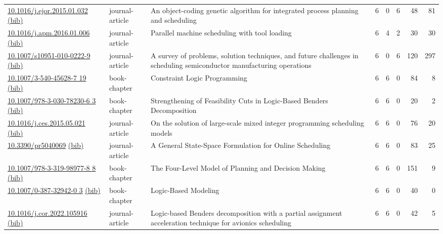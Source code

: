 {\begin{longtable}{p{5cm}lp{11cm}rrrrr}
\href{http://dx.doi.org/10.1016/j.ejor.2015.01.032}{10.1016/j.ejor.2015.01.032} \href{https://www.doi2bib.org/bib/10.1016/j.ejor.2015.01.032}{(bib)} & journal-article & An object-coding genetic algorithm for integrated process planning and scheduling & 6 & 0 & 6 & 48 & 81 \\
\href{http://dx.doi.org/10.1016/j.apm.2016.01.006}{10.1016/j.apm.2016.01.006} \href{https://www.doi2bib.org/bib/10.1016/j.apm.2016.01.006}{(bib)} & journal-article & Parallel machine scheduling with tool loading & 6 & 4 & 2 & 30 & 30 \\
\href{http://dx.doi.org/10.1007/s10951-010-0222-9}{10.1007/s10951-010-0222-9} \href{https://www.doi2bib.org/bib/10.1007/s10951-010-0222-9}{(bib)} & journal-article & A survey of problems, solution techniques, and future challenges in scheduling semiconductor manufacturing operations & 6 & 0 & 6 & 120 & 297 \\
\href{http://dx.doi.org/10.1007/3-540-45628-7_19}{10.1007/3-540-45628-7 19} \href{https://www.doi2bib.org/bib/10.1007/3-540-45628-7_19}{(bib)} & book-chapter & Constraint Logic Programming & 6 & 6 & 0 & 84 & 8 \\
\href{http://dx.doi.org/10.1007/978-3-030-78230-6_3}{10.1007/978-3-030-78230-6 3} \href{https://www.doi2bib.org/bib/10.1007/978-3-030-78230-6_3}{(bib)} & book-chapter & Strengthening of Feasibility Cuts in Logic-Based Benders Decomposition & 6 & 6 & 0 & 20 & 2 \\
\href{http://dx.doi.org/10.1016/j.ces.2015.05.021}{10.1016/j.ces.2015.05.021} \href{https://www.doi2bib.org/bib/10.1016/j.ces.2015.05.021}{(bib)} & journal-article & On the solution of large-scale mixed integer programming scheduling models & 6 & 6 & 0 & 76 & 20 \\
\href{http://dx.doi.org/10.3390/pr5040069}{10.3390/pr5040069} \href{https://www.doi2bib.org/bib/10.3390/pr5040069}{(bib)} & journal-article & A General State-Space Formulation for Online Scheduling & 6 & 6 & 0 & 83 & 25 \\
\href{http://dx.doi.org/10.1007/978-3-319-98977-8_8}{10.1007/978-3-319-98977-8 8} \href{https://www.doi2bib.org/bib/10.1007/978-3-319-98977-8_8}{(bib)} & book-chapter & The Four-Level Model of Planning and Decision Making & 6 & 6 & 0 & 151 & 9 \\
\href{http://dx.doi.org/10.1007/0-387-32942-0_3}{10.1007/0-387-32942-0 3} \href{https://www.doi2bib.org/bib/10.1007/0-387-32942-0_3}{(bib)} & book-chapter & Logic-Based Modeling & 6 & 6 & 0 & 40 & 0 \\
\href{http://dx.doi.org/10.1016/j.cor.2022.105916}{10.1016/j.cor.2022.105916} \href{https://www.doi2bib.org/bib/10.1016/j.cor.2022.105916}{(bib)} & journal-article & Logic-based Benders decomposition with a partial assignment acceleration technique for avionics scheduling & 6 & 6 & 0 & 42 & 5 \\

\end{longtable}}
